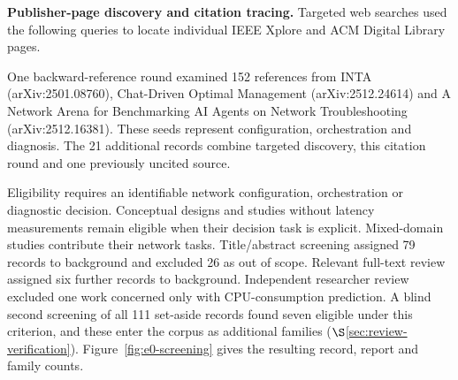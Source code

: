 \par\endgroup
\smallskip\noindent\textbf{Publisher-page discovery and citation tracing.}
Targeted web searches used the following queries to locate individual IEEE Xplore and ACM Digital Library pages.
\par\smallskip
{}
One backward-reference round examined 152 references from INTA (arXiv:2501.08760), Chat-Driven Optimal Management (arXiv:2512.24614) and A Network Arena for Benchmarking AI Agents on Network Troubleshooting (arXiv:2512.16381). These seeds represent configuration, orchestration and diagnosis. The 21 additional records combine targeted discovery, this citation round and one previously uncited source.

Eligibility requires an identifiable network configuration, orchestration or diagnostic decision. Conceptual designs and studies without latency measurements remain eligible when their decision task is explicit. Mixed-domain studies contribute their network tasks. Title/abstract screening assigned 79 records to background and excluded 26 as out of scope. Relevant full-text review assigned six further records to background. Independent researcher review excluded one work concerned only with CPU-consumption prediction. A blind second screening of all 111 set-aside records found seven eligible under this criterion, and these enter the corpus as additional families ($\S$\ref{sec:review-verification}). Figure~\ref{fig:e0-screening} gives the resulting record, report and family counts.
